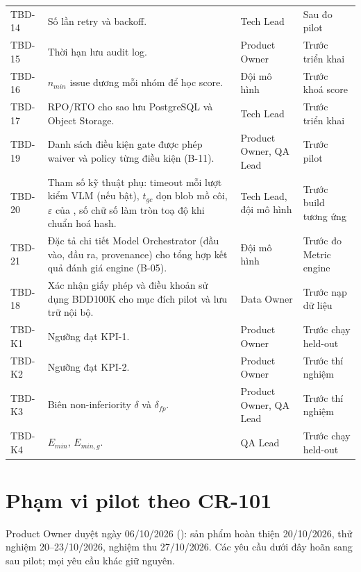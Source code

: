 \begin{xltabular}{\linewidth}{@{}L{1.4cm}Y L{3cm}L{2.6cm}@{}}
TBD-14 & Số lần retry và backoff. & Tech Lead & Sau đo pilot\\
TBD-15 & Thời hạn lưu audit log. & Product Owner & Trước triển khai\\
TBD-16 & \(n_{min}\) issue dương mỗi nhóm để học score. & Đội mô hình & Trước khoá score\\
TBD-17 & RPO/RTO cho sao lưu PostgreSQL và Object Storage. & Tech Lead & Trước triển khai\\
TBD-19 & Danh sách điều kiện gate được phép waiver và policy từng điều kiện (B-11). & Product Owner, QA Lead & Trước pilot\\
TBD-20 & Tham số kỹ thuật phụ: timeout mỗi lượt kiểm VLM (nếu bật), \(t_{gc}\) dọn blob mồ côi, \(\varepsilon\) của , số chữ số làm tròn toạ độ khi chuẩn hoá hash. & Tech Lead, đội mô hình & Trước build tương ứng\\
TBD-21 & Đặc tả chi tiết Model Orchestrator (đầu vào, đầu ra, provenance) cho tổng hợp kết quả đánh giá engine (B-05). & Đội mô hình & Trước đo Metric engine\\
TBD-18 & Xác nhận giấy phép và điều khoản sử dụng BDD100K cho mục đích pilot và lưu trữ nội bộ. & Data Owner & Trước nạp dữ liệu\\
TBD-K1 & Ngưỡng đạt KPI-1. & Product Owner & Trước chạy held-out\\
TBD-K2 & Ngưỡng đạt KPI-2. & Product Owner & Trước thí nghiệm\\
TBD-K3 & Biên non-inferiority \(\delta\) và \(\delta_{fp}\). & Product Owner, QA Lead & Trước thí nghiệm\\
TBD-K4 & \(E_{min}\), \(E_{min,g}\). & QA Lead & Trước chạy held-out\\
\end{xltabular}

\section{Phạm vi pilot theo CR-101}
\label{sec:pilot-scope}
Product Owner duyệt ngày 06/10/2026 (): sản phẩm hoàn thiện 20/10/2026, thử nghiệm 20--23/10/2026, nghiệm thu 27/10/2026. Các yêu cầu dưới đây hoãn sang sau pilot; mọi yêu cầu khác giữ nguyên.

